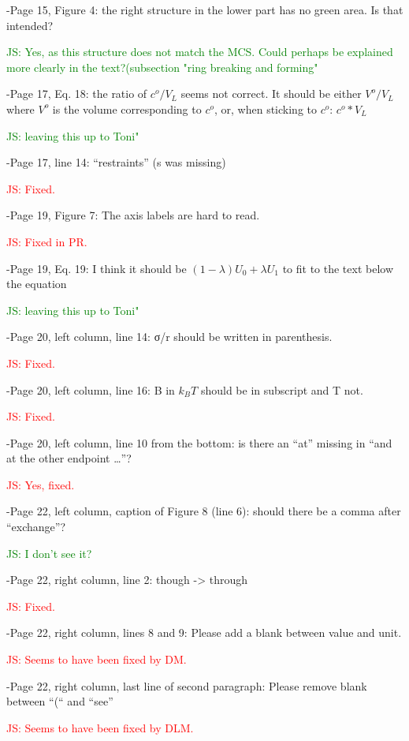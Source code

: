 \documentclass[10pt,stdletter]{newlfm}
\begin{document}
\begin{newlfm}
-Page 15, Figure 4: the right structure in the lower part has no green area. Is that intended?

\textcolor{green}{JS: Yes, as this structure does not match the MCS. Could perhaps be explained more clearly in the text?(subsection "ring breaking and forming"}

-Page 17, Eq. 18: the ratio of $c^o/V_L$ seems not correct. It should be either $V^o/V_L$ where $V^o$ is the volume corresponding to $c^o$, or, when sticking to $c^o$: $c^o * V_L$

\textcolor{green}{JS: leaving this up to Toni"}

-Page 17, line 14: “restraints” (s was missing)

\textcolor{red}{JS: Fixed.}

-Page 19, Figure 7: The axis labels are hard to read.

\textcolor{red}{JS: Fixed in PR.}

-Page 19, Eq. 19: I think it should be $(1-\lambda)U_0 + \lambda U_1$ to fit to the text below the equation

\textcolor{green}{JS: leaving this up to Toni"}

-Page 20, left column, line 14: σ/r should be written in parenthesis.

\textcolor{red}{JS: Fixed.}

-Page 20, left column, line 16: B in $k_BT$ should be in subscript and T not.

\textcolor{red}{JS: Fixed.}

-Page 20, left column, line 10 from the bottom: is there an “at” missing in “and at the other endpoint …”?

\textcolor{red}{JS: Yes, fixed.}

-Page 22, left column, caption of Figure 8 (line 6): should there be a comma after “exchange”?

\textcolor{green}{JS: I don't see it?}

-Page 22, right column, line 2: though -> through

\textcolor{red}{JS: Fixed.}

-Page 22, right column, lines 8 and 9: Please add a blank between value and unit.

\textcolor{red}{JS: Seems to have been fixed by DM.}

-Page 22, right column, last line of second paragraph: Please remove blank between “(“ and “see”

\textcolor{red}{JS: Seems to have been fixed by DLM.}


\end{newlfm}
\end{document}
